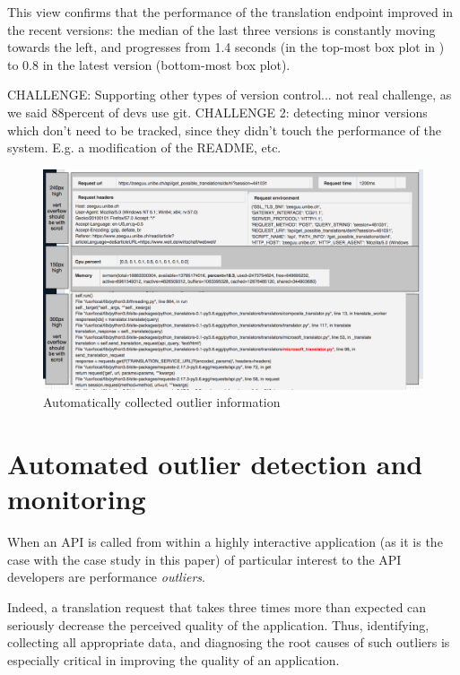\documentclass[conference]{IEEEtran}
\begin{document}
  This view confirms that the performance of the translation endpoint improved in the recent versions: the median of the last three versions is constantly moving towards the left, and progresses from 1.4 seconds (in the top-most box plot in ) to 0.8 in the latest version (bottom-most box plot).



  CHALLENGE: Supporting other types of version control... not real challenge, as we said 88percent of devs use git. 
  CHALLENGE 2: detecting minor versions which don't need to be tracked, since they didn't touch the performance of the system. E.g. a modification of the README, etc. 
  



  
  \begin{figure}[h!]
    \centering
    \includegraphics[width=\linewidth]{outliers}
    \caption{Automatically collected outlier information}
    \label{fig:figure1}
  \end{figure}
  \newpage
  \section{Automated outlier detection and monitoring}
  
  When an API is called from within a highly interactive application (as it is the case with the case study in this paper) 
  of particular interest to the API developers are performance {\em outliers}. 

  Indeed, a translation request that takes three times more than expected can seriously decrease the perceived quality of the application. Thus, identifying, collecting all appropriate data, and diagnosing the root causes of such outliers is especially critical in improving the quality of an application. 
  
\end{document}
